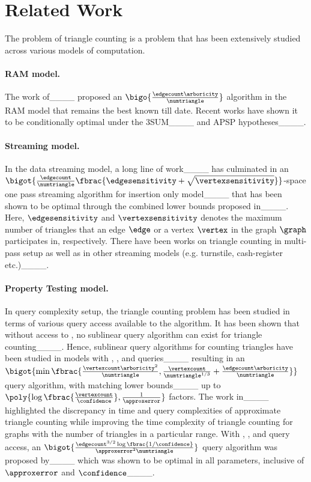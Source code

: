 \section{Related Work}
\label{ssec:related work}
The problem of triangle counting is a problem that has been extensively studied across various models of computation. 
\paragraph{RAM model.}
The work of____ proposed an $\bigo{\frac{\edgecount\arboricity}{\numtriangle}}$ algorithm in the RAM model that remains the best known till date. Recent works  have shown it to be conditionally optimal under the 3SUM____ and APSP hypotheses____. 
\paragraph{Streaming model.}
In the data streaming model, a long line of work____ has culminated in an $\bigot{\frac{\edgecount}{\numtriangle}\fbrac{\edgesensitivity+\sqrt{\vertexsensitivity}}}$-space one pass streaming algorithm for insertion only model____ that has been shown to be optimal through the combined lower bounds proposed in____. Here,  $\edgesensitivity$ and $\vertexsensitivity$  denotes the maximum number of triangles that an edge $\edge$ or a vertex $\vertex$ in the graph $\graph$ participates in, respectively. There have been works on triangle counting in multi-pass setup as well as in other streaming models (e.g. turnstile, cash-register etc.)____.

\paragraph{Property Testing model.}
In query complexity setup, the triangle counting problem has been studied in terms of various query access available to the algorithm. It has been shown that without access to \edgeexistsq{}, no sublinear query algorithm can exist for triangle counting____. Hence, sublinear query algorithms for counting triangles have been studied in models with \degreeq{}, \neighbourq{}, and \edgeexistsq{} queries____ resulting in an $\bigot{\min\fbrac{\frac{\vertexcount\arboricity^2}{\numtriangle},\frac{\vertexcount}{\numtriangle^{1/3}}+\frac{\edgecount\arboricity}{\numtriangle}}}$ query algorithm, with matching lower bounds____ up to $\poly{\log\fbrac{\frac{\vertexcount}{\confidence}},\frac{1}{\approxerror}}$ factors. The work in____ highlighted the discrepancy in time and query complexities of approximate triangle counting while improving the time complexity of triangle counting for graphs with the number of triangles in a particular range. With \randedgeq{}, \neighbourq{}, and \edgeexistsq{} query access, an $\bigot{\frac{\edgecount^{3/2}\log\fbrac{1/\confidence}}{\approxerror^2\numtriangle}}$ query algorithm was proposed by____ which was shown to be optimal in all parameters, inclusive of $\approxerror$ and $\confidence$____.